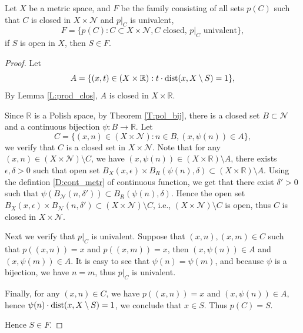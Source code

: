 \begin{lemma}
Let $X$ be a metric space, and $F$ be the family consisting of all sets 
$p(C)$ such that $C$ is closed in $X\times \mathcal{N}$ and $p|_C$ is 
univalent,
\[
  F = \{ p(C): C\subset X\times\mathcal{N}, \text{$C$ closed, $p|_C$ univalent} \},
\]
if $S$ is open in $X$, then $S\in F$.
\end{lemma}
\begin{proof}
Let 
\[
  A = \{ (x,t)\in (X\times \mathbb{R}): t \cdot \operatorname*{dist}(x,X\setminus S) = 1 \},
\]
By Lemma \ref{L:prod_clos}, $A$ is closed in $X\times\mathbb{R}$.

Since $\mathbb{R}$ is a Polish space, by Theorem \ref{T:pol_bij}, there is a closed set
$B\subset\mathcal{N}$ and a continuous bijection $\psi:B\to \mathbb{R}$. Let
\[
  C = \{ (x,n)\in (X\times\mathcal{N}) : n\in B, (x,\psi(n))\in A \},
\]
we verify that $C$ is a closed set in $X\times\mathcal{N}$.
Note that for any $(x,n)\in (X\times\mathcal{N})\setminus C$, we have
$(x,\psi(n))\in (X\times \mathbb{R})\setminus A$, 
there exists $\epsilon,\delta>0$ such that open set 
$B_X(x,\epsilon)\times B_R(\psi(n),\delta)\subset (X\times \mathbb{R})\setminus A$.
Using the defintion \ref{D:cont_metr} of continuous function, we get that there
exist $\delta'>0$ such that 
$\psi(B_{\mathcal{N}}(n,\delta'))\subset B_R(\psi(n),\delta)$. Hence the open
set
$B_X(x,\epsilon)\times B_{\mathcal{N}}(n,\delta')\subset
(X\times\mathcal{N})\setminus C$,
i.e., $(X\times\mathcal{N})\setminus C$ is open, thus $C$ is closed
in $X\times\mathcal{N}$.

Next we verify that $p|_C$ is univalent. Suppose that $(x,n),(x,m)\in C$ such
that $p((x,n))=x$ and $p((x,m))=x$, then $(x,\psi(n))\in A$ and 
$(x,\psi(m))\in A$. It is easy to see that $\psi(n)=\psi(m)$, and because $\psi$
is a bijection, we have $n=m$, thus $p|_C$ is univalent.

Finally, for any $(x,n)\in C$, we have $p((x,n))=x$ and $(x,\psi(n))\in A$, 
hence $\psi(n) \cdot \operatorname*{dist}(x,X\setminus S)=1$, we conclude that $x\in S$. Thus 
$p(C)=S$.

Hence $S\in F$.
\end{proof}


